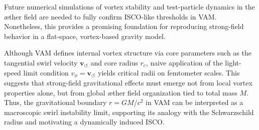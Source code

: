 Future numerical simulations of vortex stability and test-particle dynamics in the æther field are needed to fully confirm ISCO-like thresholds in VAM. Nonetheless, this provides a promising foundation for reproducing strong-field behavior in a flat-space, vortex-based gravity model.
\begin{remark}
Although VAM defines internal vortex structure via core parameters such as the tangential swirl velocity \( \mathbf{v}_{\scriptscriptstyle\boldsymbol{\circlearrowleft}} \) and core radius \( r_c \), naive application of the light-speed limit condition \( v_\phi = \mathbf{v}_{\scriptscriptstyle\boldsymbol{\circlearrowleft}} \) yields critical radii on femtometer scales. This suggests that strong-field gravitational effects must emerge not from local vortex properties alone, but from global æther field organization tied to total mass \( M \). Thus, the gravitational boundary \( r = GM/c^2 \) in VAM can be interpreted as a macroscopic swirl instability limit, supporting its analogy with the Schwarzschild radius and motivating a dynamically induced ISCO.
\end{remark}